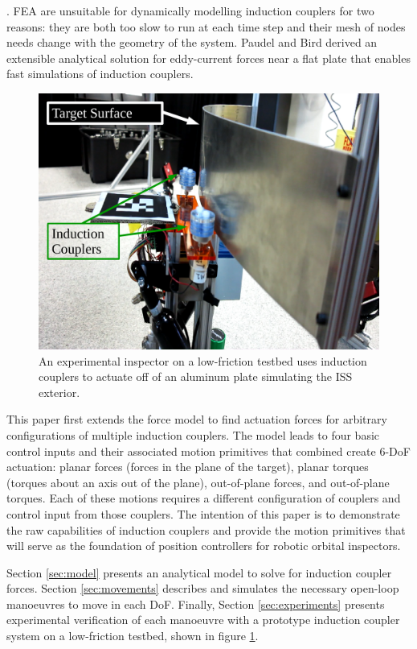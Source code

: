 \documentclass[letterpaper, 10 pt, conference]{ieeeconf}  %
\begin{document}
\cite{Bird2008}. FEA are unsuitable for dynamically modelling induction couplers for two reasons: they are both too slow to run at each time step and their mesh of nodes needs change with the geometry of the system. Paudel and Bird derived an extensible analytical solution for eddy-current forces near a flat plate that enables fast simulations of induction couplers\cite{Paudel2013}. 
%
%
 \begin{figure}[thpb]
      \centering

      \includegraphics[width = 0.75\linewidth]{figures/oop_diagram.pdf}
      \caption{An experimental inspector on a low-friction testbed uses induction couplers to actuate off of an aluminum plate simulating the ISS exterior.}
      \label{fig:oop_exp_diagram}
   \end{figure}
\par This paper first extends the force model to find actuation forces for arbitrary configurations of multiple induction couplers. The model leads to four basic control inputs and their associated motion primitives that combined create 6-DoF actuation: planar forces (forces in the plane of the target), planar torques (torques about an axis out of the plane), out-of-plane forces, and out-of-plane torques. Each of these motions requires a different configuration of couplers and control input from those couplers. The intention of this paper is to demonstrate the raw capabilities of induction couplers and provide the motion primitives that will serve as the foundation of position controllers for robotic orbital inspectors. 

\par Section \ref{sec:model} presents an analytical model to solve for induction coupler forces. Section \ref{sec:movements} describes and simulates the necessary open-loop manoeuvres to move in each DoF. Finally, Section \ref{sec:experiments} presents experimental verification of each manoeuvre with a prototype induction coupler system on a low-friction testbed, shown in figure \ref{fig:oop_exp_diagram}.
\end{document}
